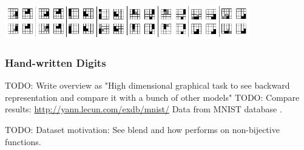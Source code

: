\begin{center} 
\includegraphics[width=0.8\textwidth]{img/cbva_back_repre.png} \citep{farkas2013bal}
\end{center} 

\subsubsection{Hand-written Digits} 
TODO: Write overview as "High dimensional graphical task to see backward representation and compare it with a bunch of other models" 
TODO: Compare results: \url{http://yann.lecun.com/exdb/mnist/} 
Data from MNIST database \citet{lecun1998gradient}. 

TODO: Dataset motivation: See blend and how performs on non-bijective functions. 

